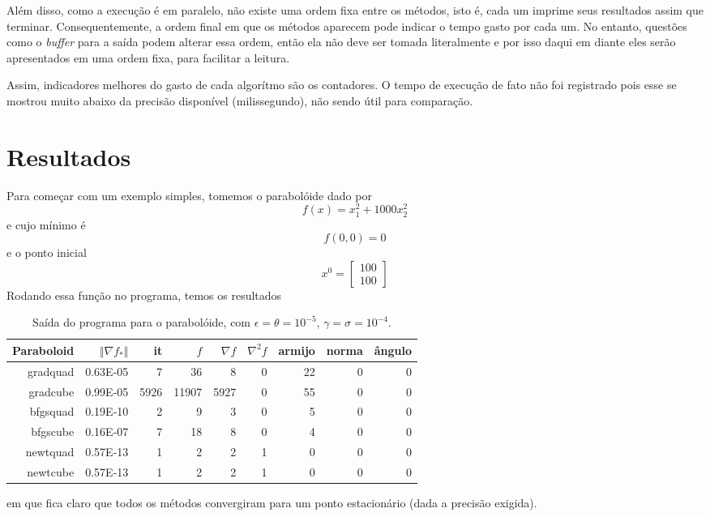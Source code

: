 \documentclass[a4paper,11pt]{article}
\begin{document}
            Além disso, como a execução é em paralelo, não existe uma ordem fixa entre os métodos, isto é, cada um imprime seus resultados assim que terminar. Consequentemente, a ordem final em que os métodos aparecem pode indicar o tempo gasto por cada um. No entanto, questões como o \emph{buffer} para a saída podem alterar essa ordem, então ela não deve ser tomada literalmente e por isso daqui em diante eles serão apresentados em uma ordem fixa, para facilitar a leitura.

            Assim, indicadores melhores do gasto de cada algorítmo são os contadores. O tempo de execução de fato não foi registrado pois esse se mostrou muito abaixo da precisão disponível (milissegundo), não sendo útil para comparação.

    \newpage
    \section*{Resultados}
        Para começar com um exemplo simples, tomemos o parabolóide dado por
            $$ f(x) = x_1^2 + 1000x_2^2 $$
        e cujo mínimo é
            $$ f(0, 0) = 0$$
        e o ponto inicial
            $$ x^0 = \begin{bmatrix}
                        100 \\
                        100
                     \end{bmatrix} $$
        Rodando essa função no programa, temos os resultados
        \begin{table}[h]
            \centering
            \begin{tabular}{r|rrrrrrrr}
                Paraboloid & $\Vert\nabla f_*\Vert$ & it & $f$ & $\nabla f $ & $\nabla^2f$ & armijo & norma & ângulo \\
                \hline
                gradquad & 0.63E-05  &       7  &      36   &      8    &     0    &    22    &     0    &     0 \\
                gradcube & 0.99E-05  &    5926  &   11907   &   5927    &     0    &    55    &     0    &     0 \\
                bfgsquad & 0.19E-10  &       2  &       9   &      3    &     0    &     5    &     0    &     0 \\
                bfgscube & 0.16E-07  &       7  &      18   &      8    &     0    &     4    &     0    &     0 \\
                newtquad & 0.57E-13  &       1  &       2   &      2    &     1    &     0    &     0    &     0 \\
                newtcube & 0.57E-13  &       1  &       2   &      2    &     1    &     0    &     0    &     0 \\
            \end{tabular}
            \caption{Saída do programa para o parabolóide, com $\epsilon = \theta = 10^{-5} $, $\gamma = \sigma = 10^{-4}$.}
        \end{table}
        em que fica claro que todos os métodos convergiram para um ponto estacionário (dada a precisão exigida).
\end{document}
